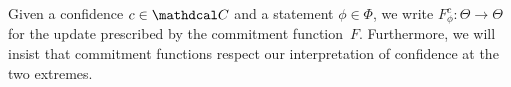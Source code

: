 \documentclass{article}
\def\cofunc{commitment function}
\def\confdom{\mathdcal C}
\begin{document}
Given a confidence $c \in \confdom$ and a statement $\phi \in \Phi$, we write
$F^c_\phi : \Theta \to \Theta$
for the update prescribed by the \cofunc\ $F$.
Furthermore, we will insist that \cofunc s respect our interpretation of confidence at the two extremes.
\end{document}
